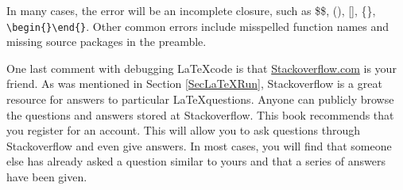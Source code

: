   In many cases, the error will be an incomplete closure, such as  \$\:\$, (), [], \{\}, \verb|\begin{}\end{}|. Other common errors include misspelled function names and missing source packages in the preamble.

  One last comment with debugging \LaTeX code is that \href{http://stackoverflow.com/}{Stackoverflow.com} is your friend. As was mentioned in Section \ref{SecLaTeXRun}, Stackoverflow is a great resource for answers to particular \LaTeX questions. Anyone can publicly browse the questions and answers stored at Stackoverflow. This book recommends that you register for an account. This will allow you to ask questions through Stackoverflow and even give answers. In most cases, you will find that someone else has already asked a question similar to yours and that a series of answers have been given.


